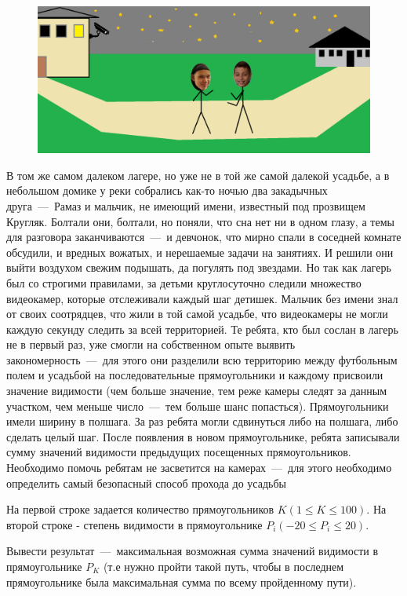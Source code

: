 \begin{figure}[h!]
	\centering
	\includegraphics[width=0.8\linewidth, keepaspectratio]{boys.png}
\end{figure}

В том же самом далеком лагере, но уже не в той же самой далекой усадьбе, 
а в небольшом домике у реки собрались как-то ночью два закадычных друга~---~Рамаз и мальчик, не имеющий имени, известный под прозвищем Кругляк. 
Болтали они, болтали, но поняли, что сна нет ни в одном глазу, а темы для разговора заканчиваются~---~и девчонок, что мирно спали в соседней комнате обсудили, 
и вредных вожатых, и нерешаемые задачи на занятиях. И решили они выйти воздухом свежим подышать, да погулять под звездами. 
Но так как лагерь был со строгими правилами, за детьми круглосуточно следили множество видеокамер, которые отслеживали каждый шаг детишек. 
Мальчик без имени знал от своих соотрядцев, что жили в той самой усадьбе, что видеокамеры не могли каждую секунду следить за всей территорией. 
Те ребята, кто был сослан в лагерь не в первый раз, уже смогли на собственном опыте выявить закономерность~---~для этого они разделили 
всю территорию между футбольным полем и усадьбой на последовательные прямоугольники и каждому присвоили значение видимости 
(чем больше значение, тем реже камеры  следят за данным участком, чем меньше число~---~тем больше шанс попасться). 
Прямоугольники имели ширину в полшага. За раз ребята могли сдвинуться либо на полшага, либо сделать целый шаг. 
После появления в новом прямоугольнике, ребята записывали сумму значений видимости предыдущих посещенных прямоугольников.
Необходимо помочь ребятам не засветится на камерах~---~для этого необходимо определить самый безопасный способ прохода до усадьбы 

\InputFile
\noindent

На первой строке задается количество прямоугольников $K (1 \leq K \leq 100)$.
На второй строке - степень видимости в прямоугольнике $P_i (-20 \leq P_i \leq 20)$.

\OutputFile
\noindent

Вывести результат~---~максимальная возможная сумма значений видимости в прямоугольнике $P_K$ (т.е нужно пройти такой путь, чтобы в последнем прямоугольнике была максимальная сумма по всему пройденному пути). 

\SAMPLES